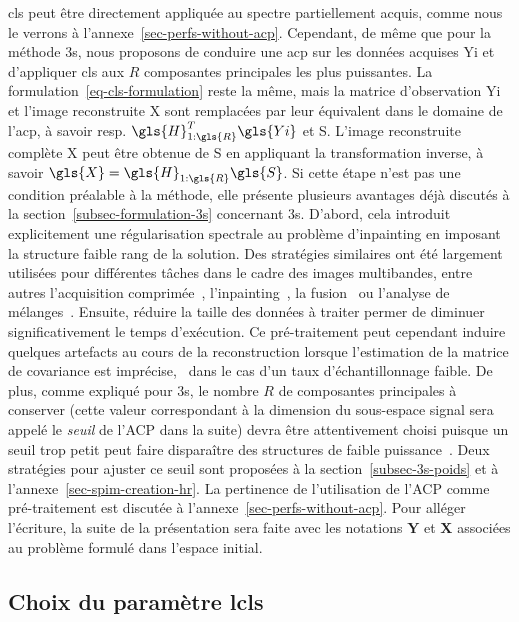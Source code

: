 \gls{cls} peut être directement appliquée au spectre partiellement acquis, comme nous le verrons à l'annexe~\ref{sec-perfs-without-acp}. Cependant, de même que pour la méthode \gls{3s}, nous proposons de conduire une \gls{acp} sur les données acquises \gls{Yi} et d'appliquer \gls{cls} aux $R$ composantes principales les plus puissantes.
%
La formulation~\eqref{eq-cls-formulation} reste la même, mais la matrice d'observation \gls{Yi} et l'image reconstruite \gls{X} sont remplacées par leur équivalent dans le domaine de l'\gls{acp}, à savoir resp. $\gls{H}_{1:\gls{R}}^T\gls{Yi}$ et \gls{S}. L'image reconstruite complète \gls{X} peut être obtenue de \gls{S} en appliquant la transformation inverse, à savoir $\gls{X} = \gls{H}_{1:\gls{R}}\gls{S}$. Si cette étape n'est pas une condition préalable à la méthode, elle présente plusieurs avantages déjà discutés à la section~\ref{subsec-formulation-3s} concernant \gls{3s}.
%
D'abord, cela introduit explicitement une régularisation spectrale au problème d'inpainting en imposant la structure faible rang de la solution. Des stratégies similaires ont été largement utilisées pour différentes tâches dans le cadre des images multibandes, entre autres l'acquisition comprimée~\cite{zhang2011joint, martin2014hyca}, l'inpainting~\cite{shuang2018fast}, la fusion~\cite{wycoff2013nonnegative,simoes2014convex,wei2015fast} ou l'analyse de mélanges~\cite{dobigeon2009joint,dobigeon2012spectral}.
%
Ensuite, réduire la taille des données à traiter permer de diminuer significativement le temps d'exécution.
%
Ce pré-traitement peut cependant induire quelques artefacts au cours de la reconstruction lorsque l'estimation de la matrice de covariance est imprécise, \eg\ dans le cas d'un taux d'échantillonnage faible. De plus, comme expliqué pour \gls{3s}, le nombre $R$ de composantes principales à conserver (cette valeur correspondant à la dimension du sous-espace signal sera appelé le \emph{seuil} de l'ACP dans la suite) devra être attentivement choisi puisque un seuil trop petit peut faire disparaître des structures de faible puissance~\cite{mevenkamp2017mm}. Deux stratégies pour ajuster ce seuil sont proposées à la section~\ref{subsec-3s-poids} et à l'annexe~\ref{sec-spim-creation-hr}. La pertinence de l'utilisation de l'ACP comme pré-traitement est discutée à l'annexe~\ref{sec-perfs-without-acp}.
%
Pour alléger l'écriture, la suite de la présentation sera faite avec les notations $\mathbf{Y}$ et $\mathbf{X}$ associées au problème formulé dans l'espace initial.

\subsection{Choix du paramètre \gls{lcls}}\label{sec-choix-param-CLS}

